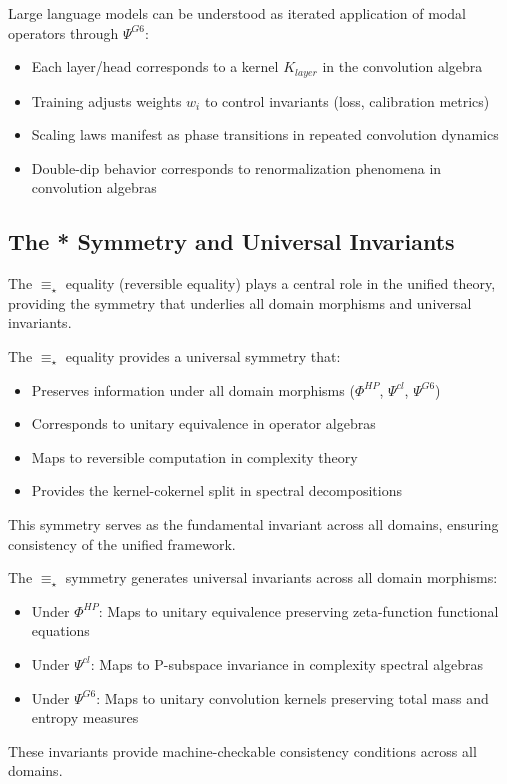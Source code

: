 \begin{theorem}
\label{thm:llm-g6-interpretation}
Large language models can be understood as iterated application of modal operators through $\Psi^{G6}$:
\begin{itemize}
\item Each layer/head corresponds to a kernel $K_{layer}$ in the convolution algebra
\item Training adjusts weights $w_i$ to control invariants (loss, calibration metrics)
\item Scaling laws manifest as phase transitions in repeated convolution dynamics
\item Double-dip behavior corresponds to renormalization phenomena in convolution algebras
\end{itemize}
\subsection{The * Symmetry and Universal Invariants}

The $\equiv_\star$ equality (reversible equality) plays a central role in the unified theory, providing the symmetry that underlies all domain morphisms and universal invariants.

\begin{definition}
\label{def:star-symmetry-universal}
The $\equiv_\star$ equality provides a universal symmetry that:
\begin{itemize}
\item Preserves information under all domain morphisms ($\Phi^{HP}$, $\Psi^{cl}$, $\Psi^{G6}$)
\item Corresponds to unitary equivalence in operator algebras
\item Maps to reversible computation in complexity theory
\item Provides the kernel-cokernel split in spectral decompositions
\end{itemize}
This symmetry serves as the fundamental invariant across all domains, ensuring consistency of the unified framework.
\end{definition}

\begin{theorem}
\label{thm:universal-invariants-star}
The $\equiv_\star$ symmetry generates universal invariants across all domain morphisms:
\begin{itemize}
\item Under $\Phi^{HP}$: Maps to unitary equivalence preserving zeta-function functional equations
\item Under $\Psi^{cl}$: Maps to P-subspace invariance in complexity spectral algebras
\item Under $\Psi^{G6}$: Maps to unitary convolution kernels preserving total mass and entropy measures
\end{itemize}
These invariants provide machine-checkable consistency conditions across all domains.
\end{theorem}


\end{theorem}

